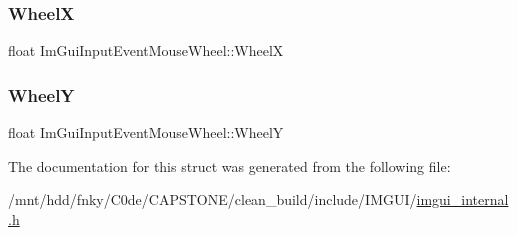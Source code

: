 \subsubsection{\texorpdfstring{WheelX}{WheelX}}
{\footnotesize\ttfamily float Im\+Gui\+Input\+Event\+Mouse\+Wheel\+::\+WheelX}

\mbox{\label{structImGuiInputEventMouseWheel_a78146a6a771f9154fc1901d48e819fdb}} 
\subsubsection{\texorpdfstring{WheelY}{WheelY}}
{\footnotesize\ttfamily float Im\+Gui\+Input\+Event\+Mouse\+Wheel\+::\+WheelY}



The documentation for this struct was generated from the following file\+:\begin{DoxyCompactItemize}
\item 
/mnt/hdd/fnky/\+C0de/\+C\+A\+P\+S\+T\+O\+N\+E/clean\+\_\+build/include/\+I\+M\+G\+U\+I/\hyperlink{imgui__internal_8h}{imgui\+\_\+internal.\+h}\end{DoxyCompactItemize}
